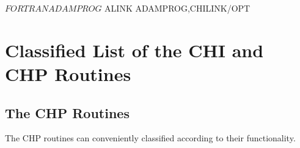 \documentclass[11pt,nolof]{starlink}
\begin{document}
\begin{terminalv}
$ FORTRAN ADAMPROG
$ ALINK ADAMPROG,CHILINK/OPT
\end{terminalv}

\appendix

\newpage
\section {Classified List of the CHI and CHP Routines}

\subsection {The CHP Routines}

The CHP routines can conveniently classified according to their functionality.
\end{document}
